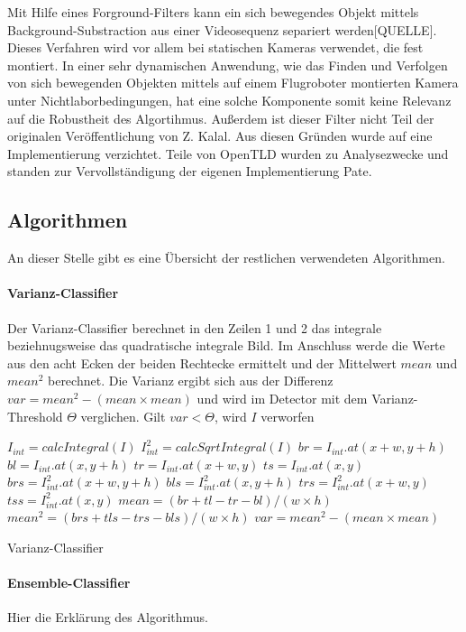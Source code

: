 Mit Hilfe eines Forground-Filters kann ein sich bewegendes Objekt mittels Background-Substraction aus einer Videosequenz separiert werden{[}QUELLE{]}. Dieses Verfahren wird vor allem bei statischen Kameras verwendet, die fest montiert. In einer sehr dynamischen Anwendung, wie das Finden und Verfolgen von sich bewegenden Objekten mittels auf einem Flugroboter montierten Kamera unter Nichtlaborbedingungen, hat eine solche Komponente somit keine Relevanz auf die Robustheit des Algortihmus. Außerdem ist dieser Filter nicht Teil der originalen Veröffentlichung von Z. Kalal. Aus diesen Gründen wurde auf eine Implementierung verzichtet. Teile von OpenTLD wurden zu Analysezwecke und standen zur Vervollständigung der eigenen Implementierung Pate.

\subsection*{Algorithmen}
An dieser Stelle gibt es eine Übersicht der restlichen verwendeten Algorithmen.

\paragraph{Varianz-Classifier}
Der Varianz-Classifier berechnet in den Zeilen 1 und 2 das integrale beziehnugsweise das quadratische integrale Bild. Im Anschluss werde die Werte aus den acht Ecken der beiden Rechtecke ermittelt und der Mittelwert $mean$ und $mean^2$ berechnet. Die Varianz ergibt sich aus der Differenz $var = mean^2 - (mean\times mean)$ und wird im Detector mit dem Varianz-Threshold $\Theta$ verglichen. Gilt $var < \Theta$, wird $I$ verworfen

\begin{algorithm}[H]
	\vspace{0.2cm}
	$I_{int} = calcIntegral(I)$\;
	$I^2_{int} = calcSqrtIntegral(I)$\;
	$br=I_{int}.at(x + w, y + h)$\;
	$bl=I_{int}.at(x, y + h)$\;
	$tr=I_{int}.at(x + w, y)$\;
	$ts=I_{int}.at(x, y)$\;
	$brs=I^2_{int}.at(x + w, y + h)$\;
	$bls=I^2_{int}.at(x, y + h)$\;
	$trs=I^2_{int}.at(x + w, y)$\;
	$tss=I^2_{int}.at(x, y)$\;
	$mean = (br + tl - tr - bl)/(w\times h)$\;
	$mean^2 = (brs + tls - trs - bls)/(w\times h)$\;
	$var = mean^2 - (mean\times mean)$\;
	\caption{Varianz-Classifier}
	\label{alg:varianz}
	\vspace{0.2cm}
\end{algorithm}

\paragraph{Ensemble-Classifier}
Hier die Erklärung des Algorithmus.

